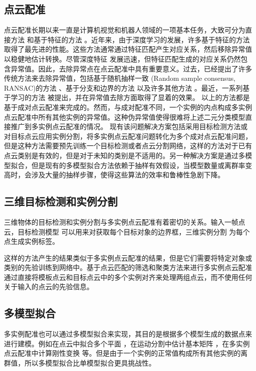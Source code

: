 \subsection{点云配准}
点云配准长期以来一直是计算机视觉和机器人领域的一项基本任务，大致可分为直接方法 \cite{besl1992method, pomerleau2015review} 和基于特征的方法 \cite{qi2017pointnet,huang2021predator,bai2021pointdsc} 。近年来，由于深度学习的发展，许多基于特征的方法取得了最先进的性能。这些方法通常通过特征匹配产生对应关系，然后移除异常值以稳健地估计转换。尽管深度特征 \cite{qi2017pointnet,huang2021predator,bai2021pointdsc, wang2022you} 发展迅速，但特征匹配生成的对应关系仍然包含异常值。因此，去除异常点在点云配准中具有重要意义。过去，已经提出了许多传统方法来去除异常值，包括基于随机抽样一致 (Random sample consensus, RANSAC)的方法 \cite{barath2021progressive,zhao2021progressive,barath2018graph} 、基于分支和边界的方法 \cite{kluger2020consac} 以及许多其他方法 \cite{huang2021predator,yang2020teaser} 。最近，一系列基于学习的方法 \cite{bai2020d3feat,yi2018learning} 被提出，并在异常值去除方面取得了显着的效果。
以上的方法都是基于成对点云配准来完成的。然而，与成对配准不同，一个实例的内点构成多实例点云配准中所有其他实例的异常值。这种伪异常值使得很难将上述二元分类模型直接推广到多实例点云配准的情况。
现有该问题解决方案包括采用目标检测方法或对目标点云应用实例分割，将多实例点云配准问题转化为多个成对点云配准问题，但是这种方法需要预先训练一个目标检测或者点云分割网络，这样的方法对于已有点云类别是有效的，但是对于未知的类别是不适用的。另一种解决方案是通过多模型拟合，但是现有的多模型拟合方法依赖于抽样有效假设，当模型数量或离群率变高时，会涉及大量的抽样步骤，使得这些算法的效率和鲁棒性急剧下降。

\subsection{三维目标检测和实例分割}
三维物体的目标检测和实例分割与多实例点云配准有着密切的关系。输入一帧点云，目标检测模型 \cite{qi2019deep} 可以用来对获取每个目标对象的边界框，三维实例分割 \cite{wang2018sgpn,han2020occuseg} 为每个点生成实例标签。

这样的方法产生的结果类似于多实例点云配准的结果，但是它们需要将特定对象或类别的先验训练到网络中。基于点云匹配的筛选和聚类方法来进行多实例点云配准通过直接将模板点云和目标点云中的多个实例对齐来处理两组点云，而不使用任何关于输入的点云的先验信息。

\subsection{多模型拟合}
多实例配准也可以通过多模型拟合来实现，其目的是根据多个模型生成的数据点来进行建模。例如在点云中拟合多个平面 \cite{barath2018multi} ，在运动分割中估计基本矩阵 \cite{hartley1997defense} ，在多实例点云配准中计算刚性变换 \cite{tang2022multi} 等。但是由于一个实例的正常值构成所有其他实例的离群值，所以多模型拟合比单模型拟合更具挑战性。

